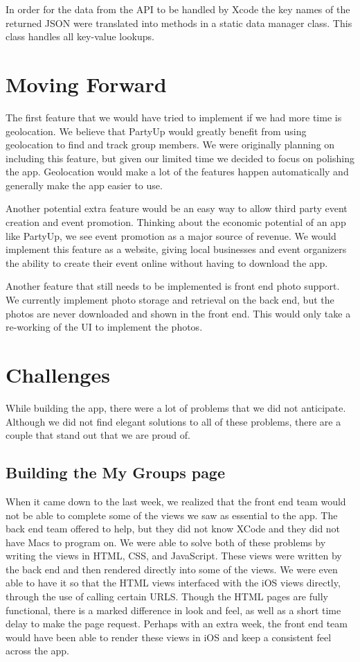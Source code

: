 \documentclass[12pt]{article}
\begin{document}
In order for the data from the API to be handled by Xcode the key names of the returned JSON were translated into methods in a static data manager class. This class handles all key-value lookups. 

\section{Moving Forward}

The first feature that we would have tried to implement if we had more time is geolocation.
We believe that PartyUp would greatly benefit from using geolocation to find and track group members.
We were originally planning on including this feature, but given our limited time we decided to focus on polishing the app. 
Geolocation would make a lot of the features happen automatically and generally make the app easier to use. 

Another potential extra feature would be an easy way to allow third party event creation and event promotion.
Thinking about the economic potential of an app like PartyUp, we see event promotion as a major source of revenue. 
We would implement this feature as a website, giving local businesses and event organizers the ability to create their event online without having to download the app.

Another feature that still needs to be implemented is front end photo support.
We currently implement photo storage and retrieval on the back end, but the photos are never downloaded and shown in the front end.
This would only take a re-working of the UI to implement the photos.

\section{Challenges}

While building the app, there were a lot of problems that we did not anticipate.
Although we did not find elegant solutions to all of these problems,
there are a couple that stand out that we are proud of.

\subsection{Building the My Groups page}

When it came down to the last week, we realized that the front end team would not be able to complete some of the views we saw as essential to the app. 
The back end team offered to help, but they did not know XCode and they did not have Macs to program on.
We were able to solve both of these problems by writing the views in  HTML, CSS, and JavaScript.
These views were written by the back end and then rendered directly into some of the views. 
We were even able to have it so that the HTML views interfaced with the iOS views directly, through the use of calling certain URLS. 
Though the HTML pages are fully functional, there is a marked difference in look and feel, as well as a short time delay to make the page request. 
Perhaps with an extra week, the front end team would have been able to render these views in iOS and keep a consistent feel across the app. 
\end{document}
